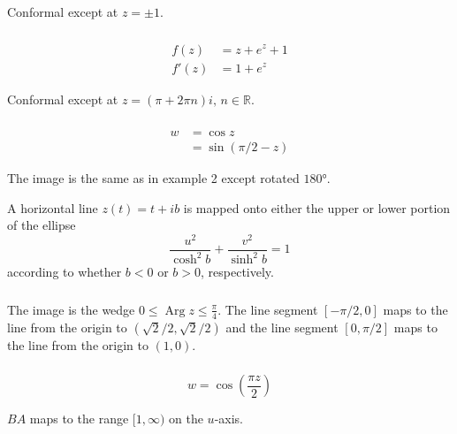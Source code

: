 \documentclass{article}
\newcommand{\Arg}{\operatorname{Arg}}
\begin{document}
Conformal except at $z = \pm 1$.

\setcounter{subsubsection}{2}
\subsubsection{}

\begin{align*}
  f(z)  & = z + e^z + 1 \\
  f'(z) & = 1 + e^z
\end{align*}

Conformal except at $z = (\pi + 2 \pi n) i, \,n \in \mathbb{R}$.

\setcounter{subsubsection}{6}
\subsubsection{}

\begin{align*}
  w & = \cos z             \\
    & = \sin (\pi / 2 - z)
\end{align*}

The image is the same as in example 2 except rotated $\ang{180}$.

A horizontal line $z(t) = t + i b$ is mapped onto either the upper or lower portion of the ellipse \[\frac{u^2}{\cosh^2 b} + \frac{v^2}{\sinh^2 b} = 1\] according to whether $b < 0$ or $b > 0$, respectively.

\setcounter{subsubsection}{8}
\subsubsection{}

The image is the wedge $0 \le \Arg z \le \frac{\pi}{4}$. The line segment $[-\pi / 2, 0]$ maps to the line from the origin to $(\sqrt{2} / 2, \sqrt{2} / 2)$ and the line segment $[0, \pi / 2]$ maps to the line from the origin to $(1, 0)$.

\setcounter{subsubsection}{10}
\subsubsection{}

\[w = \cos \left( \frac{\pi z}{2} \right)\]

$B A$ maps to the range $[1, \infty)$ on the $u$-axis.

        \setcounter{subsubsection}{12}
        \subsubsection{}
\end{document}
